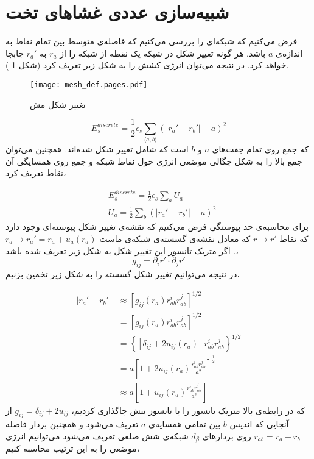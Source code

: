 \section{شبیه‌سازی عددی غشاهای تخت}

فرض می‌کنیم که شبکه‌ای را بررسی می‌کنیم که فاصله‌ی متوسط بین تمام نقاط به اندازه‌ی $a$ باشد. هر گونه تغییر شکل در شبکه یک نقطه از شبکه را از $r_a$ به $r_a'$ جابجا خواهد کرد. در نتیجه می‌توان انرژی کشش را به شکل زیر تعریف کرد (شکل
\ref{fig:mesh_def}
).
\begin{figure}[h]
\begin{center}
\texttt{[image: mesh\_def.pages.pdf]}
\caption{
تغییر شکل مش
}
\label{fig:mesh_def}
\end{center}
\end{figure}

\begin{equation}
E_s^{discrete}=\frac{1}{2}\epsilon_s\sum_{\langle a,b\rangle}\left(|r_a'-r_b'|-a\right)^2
\end{equation}
که جمع روی تمام جفت‌های $a$ و $b$ است که شامل تغییر شکل شده‌اند.  همچنین می‌توان جمع بالا را به شکل چگالی موضعی انرژی حول نقاط شبکه و جمع روی همسایگی‌ آن نقاط تعریف کرد،

\begin{equation}
\begin{aligned}
&E_s^{discrete}=\frac{1}{2}\epsilon_s\sum_aU_a\\
&U_a=\frac{1}{2}\sum_b\left(|r_a'-r_b'|-a\right)^2
\end{aligned}
\end{equation}
برای محاسبه‌ی حد پیوستگی فرض می‌کنیم که نقشه‌‌ی تغییر شکل پیوسته‌ای وجود دارد که نقاط 
$r\rightarrow r'$
که معادل نقشه‌ی گسسته‌ی شبکه‌ی ماست
$r_a\rightarrow r_a'=r_a+u_a(r_a)$
. اگر متریک تانسور این تغییر شکل به شکل زیر تعریف شده باشد،
\begin{equation}
g_{ij}=\partial_i r'\cdot\partial_jr'
\end{equation}
در نتیجه می‌توانیم تغییر شکل گسسته را به شکل زیر تخمین بزنیم،

\begin{equation}
\begin{aligned}
|r_a'-r_b'|&\approx \left[g_{ij}(r_a)r_{ab}^ir_{ab}^j\right]^{1/2}\\
&= \left[g_{ij}(r_a)r_{ab}^ir_{ab}^j\right]^{1/2}\\
&= \left\{\left[\delta_{ij}+2u_{ij}(r_a)\right]r_{ab}^ir_{ab}^j\right\}^{1/2}\\
&= a\left[1+2u_{ij}(r_a)\frac{r_{ab}^ir_{ab}^j}{a^2}\right]^\frac{1}{2}\\
&\approx a\left[1+u_{ij}(r_a)\frac{r_{ab}^ir_{ab}^j}{a^2}\right]
\label{eq:gstrain1}
\end{aligned}
\end{equation}
که در رابطه‌ی بالا متریک تانسور را با تانسوز تنش جاگذاری کردیم،
$g_{ij}=\delta_{ij}+2u_{ij}$
از آنجایی که اندیس $b$ بین تمامی همسایه‌ی $a$ تعریف می‌شود و همچنین بردار فاصله‌
$r_{ab}=r_a-r_b$
روی بردار‌های
$d_\beta$
 شبکه‌ی شش ضلعی تعریف می‌شود می‌توانیم انرژی موضعی را به این ترتیب محاسبه‌ کنیم،

